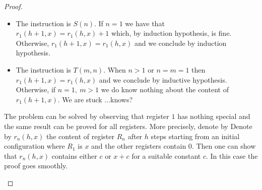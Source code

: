 \begin{exercise}
\begin{proof}
\begin{itemize}
\begin{itemize}
  \item The instruction is $S (n)$. If $n = 1$ we have that $r_1(h+1,x) = r_1(h,x)+1 $ which, by induction hypothesis, is fine. Otherwise,  $r_1(h+1,x) = r_1(h,x)$ and we conclude by induction hypothesis.
    
  \item The instruction is $T (m, n)$. When $n>1 $ or $n=m=1$ then $r_1(h+1,x) = r_1(h,x)$ and we conclude by inductive hypothesis. Otherwise, if $n = 1,\ m > 1$ we do know nothing about the content of $r_1(h+1,x) $. We are stuck ...knows?
  \end{itemize}

  \medskip The problem can be solved by observing that register $1$
  has nothing special and the same result can be proved for all
  registers. More precisely, denote by Denote by $r_n(h,x)$ the
  content of register $R_n$ after $h$ steps starting from an initial
  configuration where $R_1$ is $x$ and the other registers contain
  $0$. Then one can show that $r_n(h,x)$ contains either $c$ or $x+c$
  for a suitable constant $c$. In this case the proof goes smoothly.
\end{itemize}
\end{proof}
\end{exercise}
